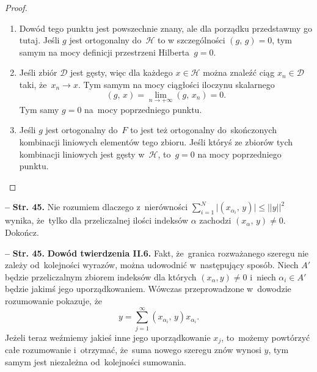 \documentclass[a4paper,11pt]{article}
\newcommand{\spaceFour}{0.5em}
\newcommand{\tb}{\textbf}
\newcommand{\noi}{\noindent}
\newcommand{\tb}{\textbf}
\newcommand{\noi}{\noindent}
\newcommand{\start}{\noi \tb{--} {}}
\newcommand{\Str}[1]{\tb{Str. #1.}}
\newcommand{\mc}{\mathcal}
\newcommand{\ra}{\rightarrow}
\providecommand{\absj}[1]{\lvert #1 \rvert}
\newcommand{\norm}[1]{\left|\left| #1 \right|\right|}
\newcommand{\al}{\alpha}
\newcommand{\Dc}{\mc{D}}
\newcommand{\Hc}{\mc{H}}
\newcommand{\Lim}{\lim\limits}
\newcommand{\nToInfty}{n \ra +\infty}
\newcommand{\Sum}{\sum\limits}
\newcommand{\Dok}{{\color{red} Dokończ.}}
\newcommand{\SP}[2]{( #1, \, #2 )}  %
\begin{document}
\begin{proof}
  \begin{enumerate}
  \item Dowód tego punktu jest powszechnie znany, ale dla porządku
    przedstawmy go tutaj. Jeśli $g$ jest ortogonalny do~$\Hc$ to w
    szczególności $\SP{ g }{ g } = 0$, tym samym na mocy definicji
    przestrzeni Hilberta~$g = 0$.
  \item Jeśli zbiór $\Dc$ jest gęsty, więc dla każdego $x \in \Hc$
    można znaleźć ciąg $x_{ n } \in \Dc$ taki, że~$x_{ n } \ra x$. Tym
    samym na mocy ciągłości iloczynu skalarnego
    \begin{equation}
      \label{eq:5}
      \SP{ g }{ x } = \Lim_{ \nToInfty } \SP{ g }{ x_{ n } } = 0.
    \end{equation}
    Tym samy $g = 0$ na~mocy poprzedniego punktu.
  \item Jeśli $g$ jest ortogonalny do~$F$ to jest też ortogonalny
    do~skończonych kombinacji liniowych elementów tego zbioru. Jeśli
    któryś ze zbiorów tych kombinacji liniowych jest gęsty w~$\Hc$,
    to~$g = 0$ na mocy poprzedniego punktu.
  \end{enumerate}
\end{proof}

\vspace{\spaceFour}


\start \Str{45} Nie rozumiem dlaczego z~nierówności
$\sum_{ i = 1 }^{ N } \absj{ \SP{ x_{ \al_{ i } } }{ y } } \leq \norm{
  y }^{ 2 }$ wynika, że~tylko dla przeliczalnej ilości indeksów $\al$
zachodzi $\SP{ x_{ \al } }{ y } \neq 0$. \Dok

\vspace{\spaceFour}


\start \Str{45} \tb{Dowód twierdzenia II.6.} Fakt, że~granica
rozważanego szeregu nie zależy od~kolejności wyrazów, można udowodnić
w~następujący sposób. Niech $A'$ będzie przeliczalnym zbiorem indeksów
dla których $( x_{ \al }, y ) \neq 0$ i~niech $\al_{ i } \in A'$
będzie jakimś jego uporządkowaniem. Wówczas przeprowadzone w~dowodzie
rozumowanie pokazuje, że
\begin{equation}
  y = \Sum_{ j = 1 }^{ \infty } \SP{ x_{ \al_{ i } } }{ y } x_{ \al_{ i } }.
\end{equation}
Jeżeli teraz weźmiemy jakieś inne jego uporządkowanie $x_{ j }$,
to~możemy powtórzyć całe rozumowanie i~otrzymać, że~suma nowego
szeregu znów wynosi $y$, tym samym jest niezależna od~kolejności
sumowania.
\end{document}
